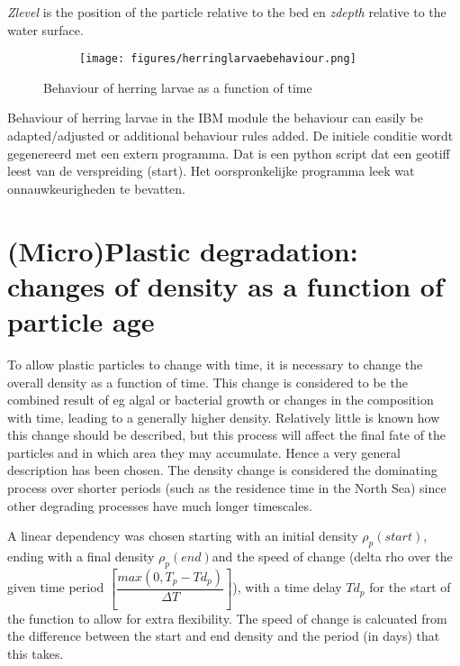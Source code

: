\documentclass[english]{deltares_manual}
\begin{document}
\textit{Zlevel} is the position of the particle relative to the bed en \textit{zdepth} relative to the water surface.
\begin{figure}[H]%
	\begin{tcolorbox}[interior hidden, 
		boxsep=0pt,
		left=0pt,
		right=0pt,
		top=0pt,]
		\begin{subfigure}{1.0\textwidth}
			\texttt{[image: figures/herringlarvaebehaviour.png]}%
		\end{subfigure}
	\end{tcolorbox}
	\caption{Behaviour of herring larvae as a function of time}
	\label{fig:herring_behaviour}
\end{figure}


Behaviour of herring larvae in the IBM module the behaviour can easily be adapted/adjusted or additional behaviour rules added.
De initiele conditie wordt gegenereerd met een extern programma. Dat is een python script dat een geotiff leest van de verspreiding (start). Het oorspronkelijke programma leek wat onnauwkeurigheden te bevatten. 

\section{(Micro)Plastic degradation: changes of density as a function of particle age}
To allow plastic particles to change with time, it is necessary to change the overall density as a function of time. This change is considered to be the combined result of eg algal or bacterial growth or changes in the composition with time, leading to a generally higher density. Relatively little is known how this change should be described, but this process will affect the final fate of the particles and in which area they may accumulate. Hence a very general description has been chosen. The density change is considered the dominating process over shorter periods (such as the residence time in the North Sea) since other degrading processes have much longer timescales. 

A linear dependency was chosen starting with an initial density $\rho_{p}(start)$, ending with a final density $\rho_{p}(end)$and the speed of change (delta rho over the given time period $\left[ \dfrac{max(0, T_{p} - Td_{p})}{\Delta T} \right]$), with a time delay $Td_{p}$ for the start of the function to allow for extra flexibility. The speed of change is calcuated from the difference between the start and end density and the period (in days) that this takes.
\end{document}
